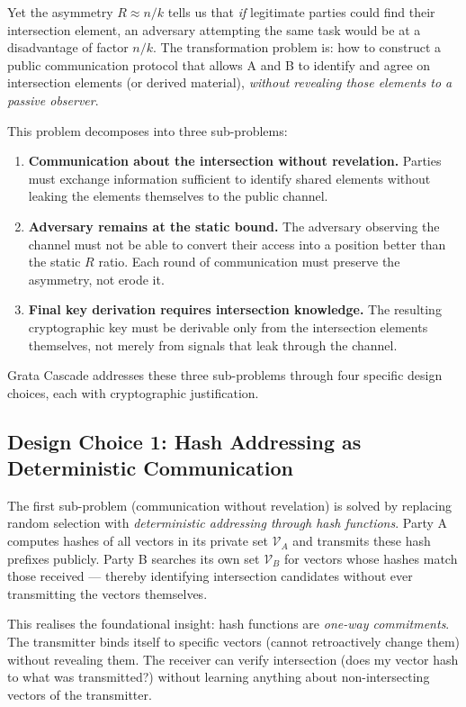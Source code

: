 \documentclass[11pt,a4paper]{article}
\begin{document}
Yet the asymmetry $R \approx n/k$ tells us that \emph{if} legitimate parties could find their intersection element, an adversary attempting the same task would be at a disadvantage of factor $n/k$. The transformation problem is: how to construct a public communication protocol that allows A and B to identify and agree on intersection elements (or derived material), \emph{without revealing those elements to a passive observer}.

This problem decomposes into three sub-problems:
\begin{enumerate}[leftmargin=*]
\item \textbf{Communication about the intersection without revelation.} Parties must exchange information sufficient to identify shared elements without leaking the elements themselves to the public channel.
\item \textbf{Adversary remains at the static bound.} The adversary observing the channel must not be able to convert their access into a position better than the static $R$ ratio. Each round of communication must preserve the asymmetry, not erode it.
\item \textbf{Final key derivation requires intersection knowledge.} The resulting cryptographic key must be derivable only from the intersection elements themselves, not merely from signals that leak through the channel.
\end{enumerate}

Grata Cascade addresses these three sub-problems through four specific design choices, each with cryptographic justification.

\subsection{Design Choice 1: Hash Addressing as Deterministic Communication}

The first sub-problem (communication without revelation) is solved by replacing random selection with \emph{deterministic addressing through hash functions}. Party A computes hashes of all vectors in its private set $\mathcal{V}_A$ and transmits these hash prefixes publicly. Party B searches its own set $\mathcal{V}_B$ for vectors whose hashes match those received --- thereby identifying intersection candidates without ever transmitting the vectors themselves.

This realises the foundational insight: hash functions are \emph{one-way commitments}. The transmitter binds itself to specific vectors (cannot retroactively change them) without revealing them. The receiver can verify intersection (does my vector hash to what was transmitted?) without learning anything about non-intersecting vectors of the transmitter.
\end{document}
